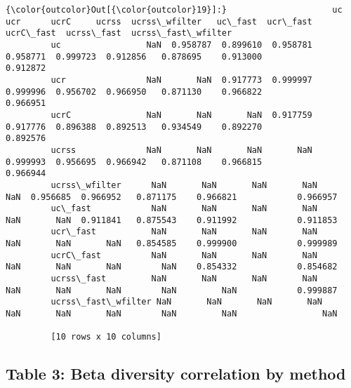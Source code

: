 \documentclass{article}
\begin{document}
            \begin{Verbatim}[commandchars=\\\{\}]
{\color{outcolor}Out[{\color{outcolor}19}]:}                     uc       ucr      ucrC     ucrss  ucrss\_wfilter   uc\_fast  ucr\_fast  ucrC\_fast  ucrss\_fast  ucrss\_fast\_wfilter
         uc                 NaN  0.958787  0.899610  0.958781       0.958771  0.999723  0.912856   0.878695    0.913000            0.912872
         ucr                NaN       NaN  0.917773  0.999997       0.999996  0.956702  0.966950   0.871130    0.966822            0.966951
         ucrC               NaN       NaN       NaN  0.917759       0.917776  0.896388  0.892513   0.934549    0.892270            0.892576
         ucrss              NaN       NaN       NaN       NaN       0.999993  0.956695  0.966942   0.871108    0.966815            0.966944
         ucrss\_wfilter      NaN       NaN       NaN       NaN            NaN  0.956685  0.966952   0.871175    0.966821            0.966957
         uc\_fast            NaN       NaN       NaN       NaN            NaN       NaN  0.911841   0.875543    0.911992            0.911853
         ucr\_fast           NaN       NaN       NaN       NaN            NaN       NaN       NaN   0.854585    0.999900            0.999989
         ucrC\_fast          NaN       NaN       NaN       NaN            NaN       NaN       NaN        NaN    0.854332            0.854682
         ucrss\_fast         NaN       NaN       NaN       NaN            NaN       NaN       NaN        NaN         NaN            0.999887
         ucrss\_fast\_wfilter NaN       NaN       NaN       NaN            NaN       NaN       NaN        NaN         NaN                 NaN
         
         [10 rows x 10 columns]
\end{Verbatim}
        

    \subsection{Table 3: Beta diversity correlation by method}
\end{document}
